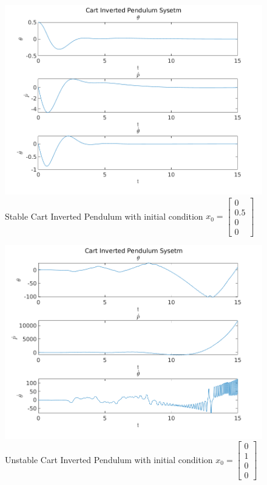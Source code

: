 \documentclass[11pt]{article}
\theoremstyle{definition}
\begin{document}
\begin{enumerate}
\begin{enumerate}
        \begin{figure}
            \centering
            \includegraphics[width = \textwidth]{StableIC_0_05_0_0.png}
            \caption{Stable Cart Inverted Pendulum with initial condition $x_0 = \begin{bmatrix} 0 \\ 0.5 \\ 0 \\ 0 \end{bmatrix}$ }
            \label{fig:cart_stable}
        \end{figure}

        \begin{figure}
            \centering
            \includegraphics[width = \textwidth]{UnstableIC_0_1_0_0.png}
            \caption{Unstable Cart Inverted Pendulum with initial condition $x_0 = \begin{bmatrix} 0 \\ 1 \\ 0 \\ 0 \end{bmatrix}$}
            \label{fig:cart_unstable}
        \end{figure}

    \end{enumerate}

\end{enumerate}
\end{document}

